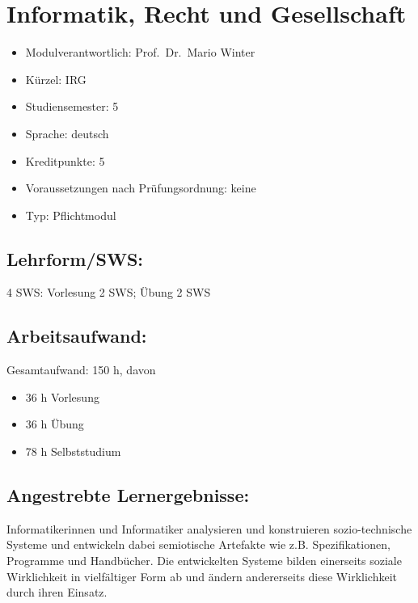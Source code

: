\chapter{Informatik, Recht und
Gesellschaft}\label{informatik-recht-und-gesellschaft}

\begin{itemize}
\tightlist
\item
  Modulverantwortlich: Prof.~Dr.~Mario Winter
\item
  Kürzel: IRG
\item
  Studiensemester: 5
\item
  Sprache: deutsch
\item
  Kreditpunkte: 5
\item
  Voraussetzungen nach Prüfungsordnung: keine
\item
  Typ: Pflichtmodul
\end{itemize}

\section*{Lehrform/SWS:}\label{lehrformsws-16}

4 SWS: Vorlesung 2 SWS; Übung 2 SWS

\section*{Arbeitsaufwand:}\label{arbeitsaufwand-15}

Gesamtaufwand: 150 h, davon

\begin{itemize}
\tightlist
\item
  36 h Vorlesung
\item
  36 h Übung
\item
  78 h Selbststudium
\end{itemize}

\section*{Angestrebte
Lernergebnisse:}\label{angestrebte-lernergebnisse-16}

Informatikerinnen und Informatiker analysieren und konstruieren
sozio-technische Systeme und entwickeln dabei semiotische Artefakte wie
z.B. Spezifikationen, Programme und Handbücher. Die entwickelten Systeme
bilden einerseits soziale Wirklichkeit in vielfältiger Form ab und
ändern andererseits diese Wirklichkeit durch ihren Einsatz.

